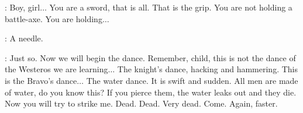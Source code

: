 \SYRIO: Boy, girl$\ldots$ You are a sword, that is all. That is the grip. You are not holding a battle-axe. You are holding$\ldots$ 

\ARYA: A needle. 

\SYRIO: Just so. Now we will begin the dance. Remember, child, this is not the dance of the Westeros we are learning$\ldots$ The knight's dance, hacking and hammering. This is the Bravo's dance$\ldots$ The water dance. It is swift and sudden. All men are made of water, do you know this? If you pierce them, the water leaks out and they die. Now you will try to strike me.  Dead. Dead. Very dead. Come. Again, faster. 



